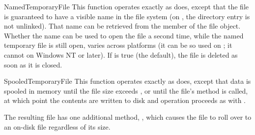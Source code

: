 \begin{funcdesc}{NamedTemporaryFile}{}
This function operates exactly as  does,
except that the file is guaranteed to have a visible name in the file
system (on \UNIX, the directory entry is not unlinked).  That name can
be retrieved from the  member of the file object.  Whether
the name can be used to open the file a second time, while the
named temporary file is still open, varies across platforms (it can
be so used on \UNIX; it cannot on Windows NT or later).
If  is true (the default), the file is deleted as soon as
it is closed.
\end{funcdesc}

\begin{funcdesc}{SpooledTemporaryFile}{}
This function operates exactly as  does,
except that data is spooled in memory until the file size exceeds
, or until the file's  method is
called, at which point the contents are written to disk and operation
proceeds as with .

The resulting file has one additional method, ,
which causes the file to roll over to an on-disk file regardless of
its size.
\end{funcdesc}

